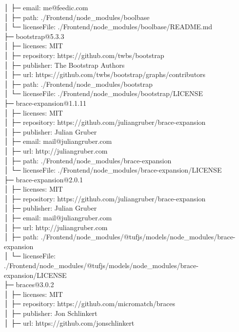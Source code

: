 │  ├─ email: me@feedic.com\\
│  ├─ path: ./Frontend/node\_modules/boolbase\\
│  └─ licenseFile: ./Frontend/node\_modules/boolbase/README.md\\
├─ bootstrap@5.3.3\\
│  ├─ licenses: MIT\\
│  ├─ repository: https://github.com/twbs/bootstrap\\
│  ├─ publisher: The Bootstrap Authors\\
│  ├─ url: https://github.com/twbs/bootstrap/graphs/contributors\\
│  ├─ path: ./Frontend/node\_modules/bootstrap\\
│  └─ licenseFile: ./Frontend/node\_modules/bootstrap/LICENSE\\
├─ brace-expansion@1.1.11\\
│  ├─ licenses: MIT\\
│  ├─ repository: https://github.com/juliangruber/brace-expansion\\
│  ├─ publisher: Julian Gruber\\
│  ├─ email: mail@juliangruber.com\\
│  ├─ url: http://juliangruber.com\\
│  ├─ path: ./Frontend/node\_modules/brace-expansion\\
│  └─ licenseFile: ./Frontend/node\_modules/brace-expansion/LICENSE\\
├─ brace-expansion@2.0.1\\
│  ├─ licenses: MIT\\
│  ├─ repository: https://github.com/juliangruber/brace-expansion\\
│  ├─ publisher: Julian Gruber\\
│  ├─ email: mail@juliangruber.com\\
│  ├─ url: http://juliangruber.com\\
│  ├─ path: ./Frontend/node\_modules/@tufjs/models/node\_modules/brace-expansion\\
│  └─ licenseFile: ./Frontend/node\_modules/@tufjs/models/node\_modules/brace-expansion/LICENSE\\
├─ braces@3.0.2\\
│  ├─ licenses: MIT\\
│  ├─ repository: https://github.com/micromatch/braces\\
│  ├─ publisher: Jon Schlinkert\\
│  ├─ url: https://github.com/jonschlinkert\\
